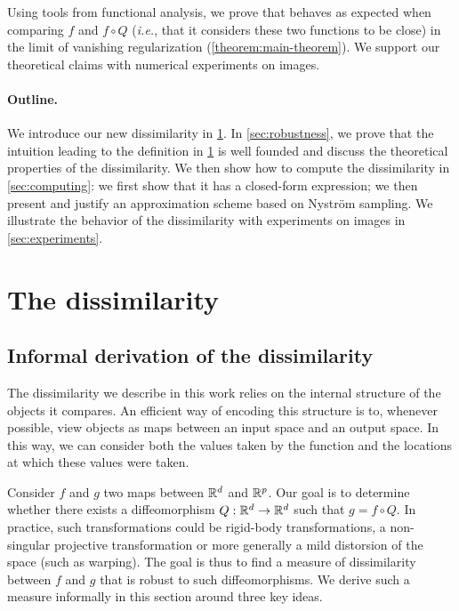 Using tools from functional analysis, we prove that \Diffy behaves as expected when comparing $f$ and $f\circ Q$ (\emph{i.e.}, that it considers these two functions to be close) in the limit of vanishing regularization (\cref{theorem:main-theorem}). We support our theoretical claims with numerical experiments on images.

\paragraph{Outline.} We introduce our new dissimilarity in \cref{sec:dissimilarity}. In \cref{sec:robustness}, we prove that the intuition leading to the definition in \cref{sec:dissimilarity} is well founded and discuss the theoretical properties of the dissimilarity. We then show how to compute the dissimilarity in \cref{sec:computing}: we first show that it has a closed-form expression; we then present and justify an approximation scheme based on Nyström sampling. We illustrate the behavior of the dissimilarity with experiments on images in \cref{sec:experiments}.

\section{The dissimilarity}\label{sec:dissimilarity}

\subsection{Informal derivation of the dissimilarity}\label{sec:informal}

The dissimilarity we describe in this work relies on the internal structure of the objects it compares. An efficient way of encoding this structure is to, whenever possible, view objects as maps between an input space and an output space. In this way, we can consider both the values taken by the function and the locations at which these values were taken.

Consider $f$ and $g$ two maps between $\mathbb R^d$ and $\mathbb R^p$. Our goal is to determine whether there exists a diffeomorphism $Q:\mathbb R^d \to \mathbb R^d$ such that $g = f \circ Q$. In practice, such transformations could be rigid-body transformations, a non-singular projective transformation or more generally a mild distorsion of the space (such as warping). The goal is thus to find a measure of dissimilarity between $f$ and $g$ that is robust to such diffeomorphisms. We derive such a measure informally in this section around three key ideas.

